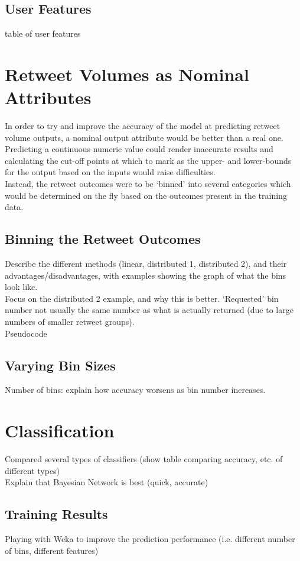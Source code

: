 \subsection{User Features}
table of user features

\section{Retweet Volumes as Nominal Attributes}
In order to try and improve the accuracy of the model at predicting retweet volume outputs, a nominal output attribute would be better than a real one. Predicting a continuous numeric value could render inaccurate results and calculating the cut-off points at which to mark as the upper- and lower-bounds for the output based on the inputs would raise difficulties.
\\
Instead, the retweet outcomes were to be `binned' into several categories which would be determined on the fly based on the outcomes present in the training data.

\subsection{Binning the Retweet Outcomes}
Describe the different methods (linear, distributed 1, distributed 2), and their advantages/disadvantages, with examples showing the graph of 
what the bins look like.
\\
Focus on the distributed 2 example, and why this is better.
`Requested' bin number not usually the same number as what is actually returned (due to large numbers of smaller retweet groups).
\\
Pseudocode

\subsection{Varying Bin Sizes}
Number of bins: explain how accuracy worsens as bin number increases.
\\

\section{Classification}
Compared several types of classifiers (show table comparing accuracy, etc. of different types)
\\
Explain that Bayesian Network is best (quick, accurate)

\subsection{Training Results}
Playing with Weka to improve the prediction performance (i.e. different number of bins, different features)


